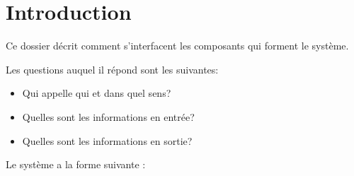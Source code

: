 \section{Introduction}

Ce dossier décrit comment s’interfacent les composants qui forment le système.

Les questions auquel il répond sont les suivantes:

\begin{itemize}
\item Qui appelle qui et dans quel sens?
\item Quelles sont les informations en entrée?
\item Quelles sont les informations en sortie?
\end{itemize}

Le système a la forme suivante :


